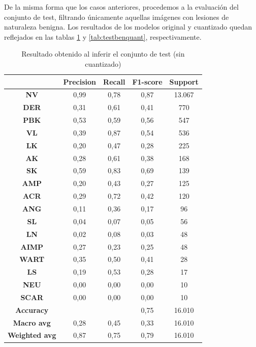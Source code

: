 De la misma forma que los casos anteriores, procedemos a la evaluación del conjunto de test, filtrando únicamente aquellas imágenes con lesiones de naturaleza benigna. Los resultados de los modelos original y cuantizado quedan reflejados en las tablas \ref{tab:testbenorig} y \ref{tab:testbenquant}, respectivamente.

\begin{table}[!ht]
	\centering
	\begin{tabular}{|c|c|c|c|c|}
		\hline
		~ & \textbf{Precision} & \textbf{Recall} &\textbf{ F1-score} & \textbf{Support} \\ \hline
		\textbf{NV} & 0,99 & 0,78 & 0,87 & 13.067 \\ 
		\textbf{DER} & 0,31 & 0,61 & 0,41 & 770 \\ 
		\textbf{PBK} & 0,53 & 0,59 & 0,56 & 547 \\ 
		\textbf{VL} & 0,39 & 0,87 & 0,54 & 536 \\ 
		\textbf{LK} & 0,20 & 0,47 & 0,28 & 225 \\ 
		\textbf{AK} & 0,28 & 0,61 & 0,38 & 168 \\ 
		\textbf{SK} & 0,59 & 0,83 & 0,69 & 139 \\ 
		\textbf{AMP} & 0,20 & 0,43 & 0,27 & 125 \\ 
		\textbf{ACR} & 0,29 & 0,72 & 0,42 & 120 \\ 
		\textbf{ANG} & 0,11 & 0,36 & 0,17 & 96 \\ 
		\textbf{SL} & 0,04 & 0,07 & 0,05 & 56 \\ 
		\textbf{LN} & 0,02 & 0,08 & 0,03 & 48 \\ 
		\textbf{AIMP} & 0,27 & 0,23 & 0,25 & 48 \\ 
		\textbf{WART} & 0,35 & 0,50 & 0,41 & 28 \\ 
		\textbf{LS} & 0,19 & 0,53 & 0,28 & 17 \\ 
		\textbf{NEU} & 0,00 & 0,00 & 0,00 & 10 \\ 
		\textbf{SCAR} & 0,00 & 0,00 & 0,00 & 10 \\ \hline
		\textbf{Accuracy} & ~ & ~ & 0,75 & 16.010 \\ \hline
		\textbf{Macro avg} & 0,28 & 0,45 & 0,33 & 16.010 \\ 
		\textbf{Weighted avg} & 0,87 & 0,75 & 0,79 & 16.010 \\ \hline
	\end{tabular}
	\caption{Resultado obtenido al inferir el conjunto de test (sin cuantizado)}
	\label{tab:testbenorig}
\end{table}

